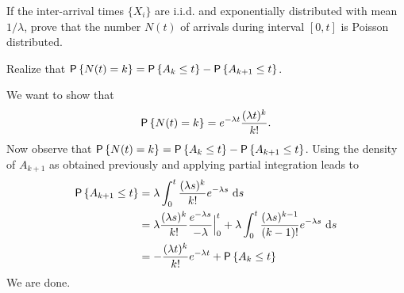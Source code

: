 \begin{exercise}
  If the inter-arrival times $\{X_i\}$ are i.i.d. and exponentially
  distributed with mean $1/\lambda$, prove that the number $N(t)$ of
  arrivals during interval $[0,t]$ is Poisson distributed.
  \begin{hint}
  Realize that
    $\P{N(t)=k} = \P{A_k \leq t} - \P{A_{k+1} \leq t}$.
  \end{hint}
    \begin{solution}
      We want to show that
    \begin{equation*}
      \P{N(t)=k} = e^{-\lambda t}\frac{(\lambda t)^k}{k!}.
    \end{equation*}
    Now observe that
    $\P{N(t)=k} = \P{A_k \leq t} - \P{A_{k+1} \leq t}$.  Using the
    density of $A_{k+1}$ as obtained previously and applying partial
    integration leads to
\begin{equation*}
  \begin{split}
\P{A_{k+1} \leq t} 
&= \lambda \int_0^t \frac{(\lambda s)^{k}}{k!}e^{-\lambda s}\, \d s \\
&= \lambda \frac{(\lambda s)^{k}}{k!}\frac{e^{-\lambda s}}{-\lambda} \Big|_{0}^t + \lambda \int_0^t \frac{(\lambda s)^{k-1}}{(k-1)!}e^{-\lambda s}\, \d s \\
&= - \frac{(\lambda t)^{k}}{k!} e^{-\lambda t} + \P{A_k \leq t}
  \end{split}
\end{equation*}
We are done.
    \end{solution}
\end{exercise}



